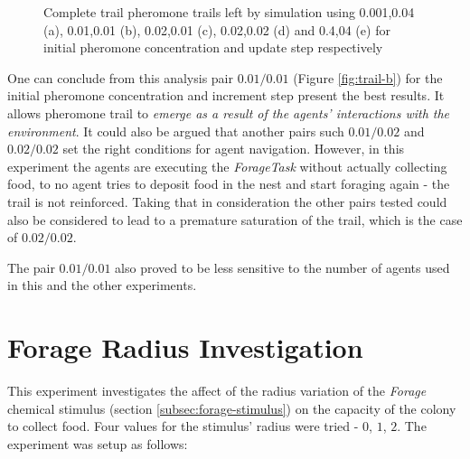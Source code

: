 \begin{figure}[H]
 \quad

\caption[Example of complete pheromone trails]{Complete trail pheromone trails left by simulation using 0.001,0.04 (a), 0.01,0.01 (b), 0.02,0.01 (c), 0.02,0.02 (d) and 0.4,04 (e) for initial pheromone concentration and update step respectively}
\label{fig:trails}
\end{figure}

One can conclude from this analysis pair $0.01/0.01$ (Figure \ref{fig:trail-b}) for the initial pheromone concentration and increment step present the best results. It allows pheromone trail to \emph{emerge as a result of the agents' interactions with the environment}. It could also be argued that another pairs such $0.01/0.02$ and $0.02/0.02$ set the right conditions for agent navigation. However, in this experiment the agents are executing the \emph{ForageTask} without actually collecting food, to no agent tries to deposit food in the nest and start foraging again - the trail is not reinforced. Taking that in consideration the other pairs tested could also be considered to lead to a premature saturation of the trail, which is the case of $0.02/0.02$.

The pair $0.01/0.01$ also proved to be less sensitive to the number of agents used in this and the other experiments.

\section{Forage Radius Investigation}
\label{sec:forage-radius-inv}

This experiment investigates the affect of the radius variation of the \emph{Forage} chemical stimulus (section \ref{subsec:forage-stimulus}) on the capacity of the colony to collect food. Four values for the stimulus' radius were tried - $0$, $1$, $2$. The experiment was setup as follows:

